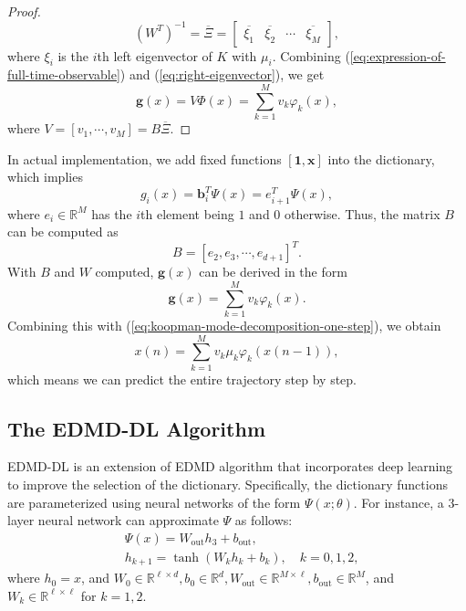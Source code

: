 \begin{proof}
\begin{equation}
    \label{eq:right-eigenvector}
    (W^T)^{-1} = \overline{\Xi}
    = \left[
      \begin{array}{cccc}
        \overline{\xi_1}&\overline{\xi_2}&\cdots&\overline{\xi_M}
      \end{array}
    \right],
  \end{equation}
  where $\xi_i$ is the $i$th left eigenvector of $K$ with $\mu_i$.
  Combining (\ref{eq:expression-of-full-time-observable})
  and (\ref{eq:right-eigenvector}),
  we get
  \begin{equation}
    \label{eq:expression-of-g}
    \mathbf{g}(x) = V \Phi(x) = \sum\limits_{k = 1}^M v_k \varphi_k(x),
  \end{equation}
  where $V = [v_1,\cdots,v_M] = B\overline{\Xi} $.
\end{proof}

In actual implementation,
we add fixed functions
$[\mathbf{1}, \mathbf{x}]$ into the dictionary,
which implies
\begin{equation*}
g_i(x) = \mathbf{b}_i^T \Psi(x) = e_{i+1}^T \Psi(x),
\end{equation*}
where $e_i \in \mathbb{R}^M$ has the $i$th element being $1$
and $0$ otherwise.
Thus, the matrix $B$ can be computed as
\begin{equation*}
  B = [e_2, e_3, \cdots, e_{d+1}]^T.
\end{equation*}
With $B$ and $W$ computed, $\mathbf{g}(x)$ can be derived in the form
\begin{equation*}
  \mathbf{g}(x) = \sum\limits_{k = 1}^M v_k\varphi_k(x).
\end{equation*}
Combining this with (\ref{eq:koopman-mode-decomposition-one-step}), we obtain
\begin{equation*}
  x(n) = \sum\limits_{k = 1}^M v_k \mu_k \varphi_k(x(n-1)),
\end{equation*}
which means we can predict the entire trajectory step by step.

\subsection{The EDMD-DL Algorithm}

EDMD-DL is an extension of EDMD algorithm that
incorporates deep learning to improve the selection of the dictionary.
Specifically, the dictionary functions are parameterized using neural networks
of the form $\Psi(x;\theta)$.
For instance, a 3-layer neural network can
approximate $\Psi$ as follows:
\begin{align*}
  &\Psi(x) = W_{\text{out}}h_3 + b_{\text{out}},\\
  &h_{k+1} = \tanh(W_kh_k + b_k), \quad k = 0,1,2,
\end{align*}
where $h_0 = x$, and
$W_0 \in \mathbb{R}^{\ell \times d}, b_0 \in \mathbb{R}^d, W_{\text{out}} \in
\mathbb{R}^{M \times \ell}, b_{\text{out}} \in \mathbb{R}^M$,
and $W_k \in \mathbb{R}^{\ell \times \ell}$ for $k = 1, 2$.


